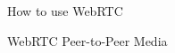 \begin{frame}{How to use WebRTC}

\end{frame}

\begin{frame}{WebRTC Peer-to-Peer Media}

\end{frame}